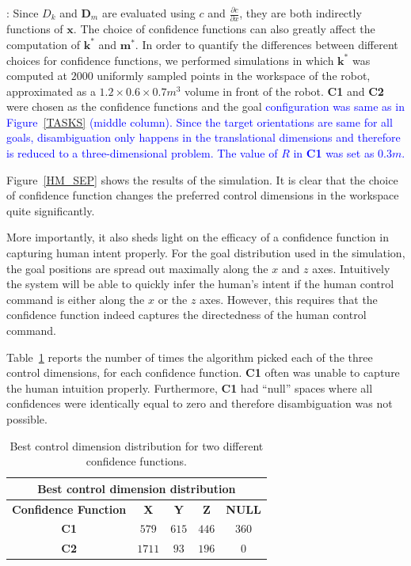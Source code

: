 \documentclass[conference]{IEEEtran}
\begin{document}
: Since $D_{k}$ and $\boldsymbol{D}_{m}$ are evaluated using $c$ and $\frac{\partial c}{\partial x}$, they are both indirectly functions of $\boldsymbol{x}$. The choice of confidence functions can also greatly affect the computation of $\boldsymbol{k}^*$ and $\boldsymbol{m}^*$. In order to quantify the differences between different choices for confidence functions, we performed simulations in which $\boldsymbol{k}^*$ was computed at $2000$ uniformly sampled points in the workspace of the robot, approximated as a $1.2\times0.6\times0.7 m^3$ volume in front of the robot. \textbf{C1} and \textbf{C2} were chosen as the confidence functions and the goal \textcolor{blue}{configuration was same as in Figure~\ref{TASKS} (middle column). Since the target orientations are same for all goals, disambiguation only happens in the translational dimensions and therefore is reduced to a three-dimensional problem. The value of $R$ in \textbf{C1} was set as $0.3m$.} 

Figure~\ref{HM_SEP} shows the results of the simulation. It is clear that the choice of confidence function changes the preferred control dimensions in the workspace quite significantly. 

More importantly, it also sheds light on the efficacy of a confidence function in capturing human intent properly. For the goal distribution used in the simulation, the goal positions are spread out maximally along the $x$ and $z$ axes. Intuitively the system will be able to quickly infer the human's intent if the human control command is either along the $x$ or the $z$ axes. However, this requires that the confidence function indeed captures the directedness of the human control command. 

Table~\ref{HMD} reports the number of times the algorithm picked each of the three control dimensions, for each confidence function.  
\textbf{C1} often was unable to capture the human intuition properly. Furthermore, \textbf{C1} had ``null'' spaces where all confidences were identically equal to zero and therefore disambiguation was not possible.
\begin{table}[t]
	\centering
	\begin{tabular}{|c|c|c|c|c|}
		\hline
		\multicolumn{5}{|c|}{Best control dimension distribution} \\
		\hline
		\textbf{Confidence Function} & \textbf{X} & \textbf{Y} & \textbf{Z} & \textbf{NULL} \\ \hline
		
		\textbf{C1} & $579$ & $615$ & $446$ & $360$ \\ \hline
		\textbf{C2} & $1711$ & $93$ & $196$ & $0$\\ \hline
		
	\end{tabular}
	\vspace{.2cm}
	\caption{Best control dimension distribution for two different confidence functions.} 
	\label{HMD}
	\vspace{-.5cm}
\end{table}
\end{document}
